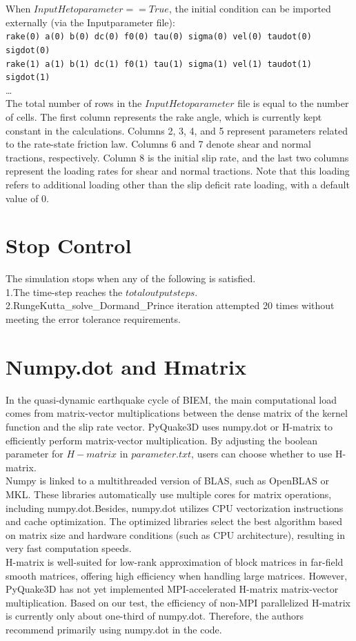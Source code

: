 \documentclass[a4paper,12pt]{article}
\begin{document}
When $InputHetoparameter ==True$, the initial condition can be imported externally (via the Inputparameter file):\\
\texttt{rake(0)	  a(0)  b(0)   dc(0)  f0(0)  tau(0)  sigma(0) vel(0) taudot(0) sigdot(0)}\\
\texttt{rake(1)	  a(1)  b(1)   dc(1)  f0(1)  tau(1)  sigma(1) vel(1) taudot(1) sigdot(1)}\\
…\\
The total number of rows in the $InputHetoparameter$ file is equal to the number of cells. The first column represents the rake angle, which is currently kept constant in the calculations. Columns 2, 3, 4, and 5 represent parameters related to the rate-state friction law. Columns 6 and 7 denote shear and normal tractions, respectively. Column 8 is the initial slip rate, and the last two columns represent the loading rates for shear and normal tractions. Note that this loading refers to additional loading other than the slip deficit rate loading, with a default value of 0.


\section{Stop Control}
The simulation stops when any of the following is satisfied.\\
1.The time-step reaches the $totaloutputsteps$.\\
2.RungeKutta\_solve\_Dormand\_Prince iteration attempted 20 times without meeting the error tolerance requirements.\\


\section{Numpy.dot and Hmatrix}
In the quasi-dynamic earthquake cycle of BIEM, the main computational load comes from matrix-vector multiplications between the dense matrix of the kernel function and the slip rate vector. PyQuake3D uses numpy.dot or H-matrix to efficiently perform matrix-vector multiplication. By adjusting the boolean parameter for $H-matrix$ in $parameter.txt$, users can choose whether to use H-matrix. \\
Numpy is linked to a multithreaded version of BLAS, such as OpenBLAS or MKL. These libraries automatically use multiple cores for matrix operations, including numpy.dot.Besides, numpy.dot utilizes CPU vectorization instructions and cache optimization. The optimized libraries select the best algorithm based on matrix size and hardware conditions (such as CPU architecture), resulting in very fast computation speeds.\\
H-matrix is well-suited for low-rank approximation of block matrices in far-field smooth matrices, offering high efficiency when handling large matrices. However, PyQuake3D has not yet implemented MPI-accelerated H-matrix matrix-vector multiplication. Based on our test, the efficiency of non-MPI parallelized H-matrix is currently only about one-third of numpy.dot. Therefore, the authors recommend primarily using numpy.dot in the code.
\end{document}
